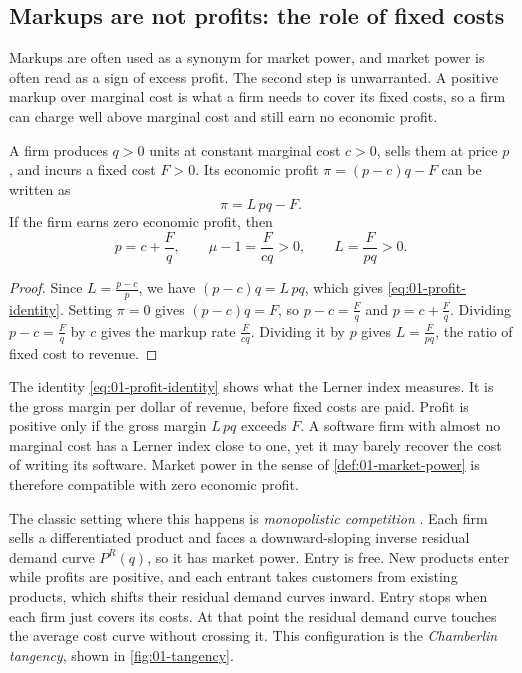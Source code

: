 \subsection{Markups are not profits: the role of fixed costs}\label{sec:01-fixed-costs}

Markups are often used as a synonym for market power, and market power is often read as a sign of excess
profit. The second step is unwarranted. A positive markup over marginal cost is what a firm needs to cover its
fixed costs, so a firm can charge well above marginal cost and still earn no economic profit.

\begin{proposition}\label{prop:01-zero-profit-markup}
A firm produces $q > 0$ units at constant marginal cost $c > 0$, sells them at price $p$, and incurs a fixed
cost $F > 0$. Its economic profit $\pi = (p - c)q - F$ can be written as
\begin{equation}\label{eq:01-profit-identity}
  \pi = L\,pq - F .
\end{equation}
If the firm earns zero economic profit, then
\begin{equation}\label{eq:01-zero-profit-markup}
  p = c + \frac{F}{q}, \qquad \mu - 1 = \frac{F}{cq} > 0, \qquad L = \frac{F}{pq} > 0 .
\end{equation}
\end{proposition}

\begin{proof}
Since $L = \frac{p - c}{p}$, we have $(p - c)q = L\,pq$, which gives \eqref{eq:01-profit-identity}. Setting
$\pi = 0$ gives $(p - c)q = F$, so $p - c = \frac{F}{q}$ and $p = c + \frac{F}{q}$. Dividing
$p - c = \frac{F}{q}$ by $c$ gives the markup rate $\frac{F}{cq}$. Dividing it by $p$ gives
$L = \frac{F}{pq}$, the ratio of fixed cost to revenue.
\end{proof}

The identity \eqref{eq:01-profit-identity} shows what the Lerner index measures. It is the gross margin per
dollar of revenue, before fixed costs are paid. Profit is positive only if the gross margin $L\,pq$ exceeds $F$.
A software firm with almost no marginal cost has a Lerner index close to one, yet it may barely recover the cost
of writing its software. Market power in the sense of \cref{def:01-market-power} is therefore compatible with
zero economic profit.

The classic setting where this happens is \emph{monopolistic competition} \citep{Chamberlin1933}. Each firm
sells a differentiated product and faces a downward-sloping inverse residual demand curve $P^R(q)$, so it has
market power. Entry is free. New products enter while profits are positive, and each entrant takes customers
from existing products, which shifts their residual demand curves inward. Entry stops when each firm just covers
its costs. At that point the residual demand curve touches the average cost curve without crossing it. This
configuration is the \emph{Chamberlin tangency}, shown in \cref{fig:01-tangency}.

